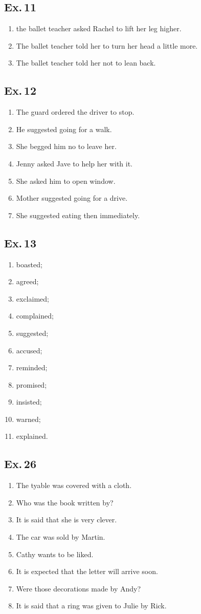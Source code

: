 \documentclass[a4paper,10pt,notitlepage,pdftex,headsepline]{scrartcl}
\begin{document}
\subsection{Ex.\,11}
\begin{enumerate}
\item the ballet teacher asked Rachel to lift her leg higher.
\item The ballet teacher told her to turn her head a little more.
\item The ballet teacher told her not to lean back.
\end{enumerate}
\subsection{Ex.\,12}
\begin{enumerate}
\item The guard ordered the driver to stop.
\item He suggested going for a walk.
\item She begged him no to leave her.
\item Jenny asked Jave to help her with it.
\item She asked him to open window.
\item Mother suggested going for a drive.
\item She suggested eating then immediately.
\end{enumerate}
\subsection{Ex.\,13}
\begin{enumerate}
\item boasted;
\item agreed;
\item exclaimed;
\item complained;
\item suggested;
\item accused;
\item reminded;
\item promised;
\item insisted;
\item warned;
\item explained.
\end{enumerate}
\subsection{Ex.\,26}
\begin{enumerate}
\item The tyable was covered with a cloth.
\item Who was the book written by?
\item It is said that she is very clever.
\item The car was sold by Martin.
\item Cathy wants to be liked.
\item It is expected that the letter will arrive soon.
\item Were those decorations made by Andy?
\item It is said that a ring was given to Julie by Rick.
\end{enumerate}
\end{document}
